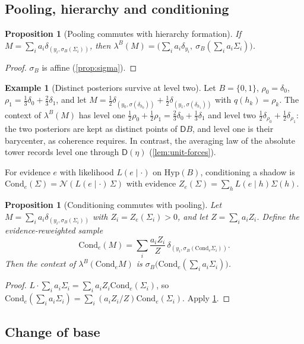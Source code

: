 \documentclass[11pt]{article}
\newtheorem{proposition}[theorem]{Proposition}
\theoremstyle{definition}
\newtheorem{example}[theorem]{Example}
\theoremstyle{remark}
\newcommand{\D}{\mathsf{D}}
\newcommand{\Hyp}{\mathrm{Hyp}}
\newcommand{\Cond}{\mathrm{Cond}}
\newcommand{\N}{\mathcal{N}}
\begin{document}
\subsection{Pooling, hierarchy and conditioning}

\begin{proposition}[Pooling commutes with hierarchy formation]\label{prop:pooling}
If $M=\sum_ia_i\delta_{(y_i,\sigma_B(\Sigma_i))}$, then
$\lambda^B(M)=\big(\sum_ia_i\delta_{y_i},\ \sigma_B(\sum_ia_i\Sigma_i)\big)$.
\end{proposition}
\begin{proof}
$\sigma_B$ is affine (\cref{prop:sigma}).
\end{proof}

\begin{example}[Distinct posteriors survive at level two]\label{ex:level2}
Let $B=\{0,1\}$, $\rho_0=\delta_0$, $\rho_1=\tfrac13\delta_0+\tfrac23\delta_1$, and let
$M=\tfrac12\delta_{(y_0,\sigma(\delta_{h_0}))}+\tfrac12\delta_{(y_1,\sigma(\delta_{h_1}))}$ with
$q(h_k)=\rho_k$. The context of $\lambda^B(M)$ has level one
$\tfrac12\rho_0+\tfrac12\rho_1=\tfrac23\delta_0+\tfrac13\delta_1$ and level two
$\tfrac12\delta_{\rho_0}+\tfrac12\delta_{\rho_1}$: the two posteriors are kept as distinct points of
$\D B$, and level one is their barycenter, as coherence requires. In contrast, the averaging law of
the absolute tower records level one through $\D(\eta)$ (\cref{lem:unit-forces}).
\end{example}

For evidence $e$ with likelihood $L(e\mid\cdot)$ on $\Hyp(B)$, conditioning a shadow is
$\Cond_e(\Sigma)=\N(L(e\mid\cdot)\,\Sigma)$ with evidence $Z_e(\Sigma)=\sum_hL(e\mid h)\Sigma(h)$.

\begin{proposition}[Conditioning commutes with pooling]\label{prop:cond-pool}
Let $M=\sum_ia_i\delta_{(y_i,\sigma_B(\Sigma_i))}$ with $Z_i=Z_e(\Sigma_i)>0$, and let
$Z=\sum_ia_iZ_i$. Define the evidence-reweighted sample
\[
\Cond_e(M)=\sum_i\frac{a_iZ_i}{Z}\,\delta_{(y_i,\sigma_B(\Cond_e\Sigma_i))}.
\]
Then the context of $\lambda^B(\Cond_eM)$ is $\sigma_B\big(\Cond_e(\sum_ia_i\Sigma_i)\big)$.
\end{proposition}
\begin{proof}
$L\cdot\sum_ia_i\Sigma_i=\sum_ia_iZ_i\Cond_e(\Sigma_i)$, so
$\Cond_e(\sum_ia_i\Sigma_i)=\sum_i(a_iZ_i/Z)\Cond_e(\Sigma_i)$. Apply \cref{prop:pooling}.
\end{proof}

\subsection{Change of base}
\end{document}
